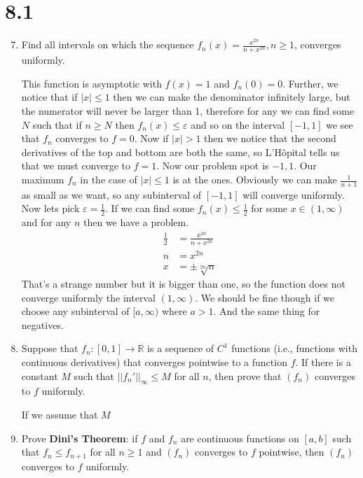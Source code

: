 \documentclass[letterpaper]{article}
\begin{document}
\renewcommand{\labelenumi}{\Alph{enumi}.}
\renewcommand{\labelenumii}{(\alph{enumii})}
\section*{8.1}
\begin{enumerate}
\setcounter{enumi}{6}
\item
  Find all intervals on which the sequence $f_n(x)=\frac{x^{2n}}{n+x^{2n}},n\ge 1$, converges uniformly.

  This function is asymptotic with $f(x)=1$ and $f_n(0)=0$. 
  Further, we notice that if $|x|\le 1$ then we can make the denominator infinitely large, but the numerator will never be larger than 1, therefore for any \varepsilon we can find some $N$ such that if $n\ge N$ then $f_n(x)\le \varepsilon$ and so on the interval $[-1,1]$ we see that $f_n$ converges to $f=0$. Now if $|x|>1$ then we notice that the second derivatives of the top and bottom are both the same, so L'Hôpital tells us that we must converge to $f=1$. Now our problem spot is $-1,1$. Our maximum $f_n$ in the case of $|x|\le 1$ is at the ones. Obviously we can make $\frac{1}{n+1}$ as small as we want, so any subinterval of $[-1,1]$ will converge uniformly. Now lets pick $\varepsilon=\frac{1}{2}$. If we can find some $f_n(x)\le \frac{1}{2}$ for some $x\in (1,\infty)$ and for any $n$ then we have a problem.
  \begin{align*}
    \frac{1}{2}&=\frac{x^{2n}}{n+x^{2n}}\\
    n&=x^{2n}\\
    x&=\pm\sqrt[2n]{n}
  \end{align*}
  That's a strange number but it is bigger than one, so the function does not converge uniformly the interval $(1,\infty)$. We should be fine though if we choose any subinterval of $[a,\infty)$ where $a>1$. And the same thing for negatives.
  \item
  Suppose that $f_n:[0,1]\to \mathbb{R}$ is a sequence of $C^1$ functions (i.e., functions with continuous derivatives) that converges pointwise to a function $f$. If there is a constant $M$ such that $||f_n'||_\infty\le M$ for all $n$, then prove that $(f_n)$ converges to $f$ uniformly.

  If we assume that $M$

\item
  Prove {\bfseries Dini's Theorem}: if $f$ and $f_n$ are continuous functions on $[a,b]$ such that $f_n\le f_{n+1}$ for all $n\ge 1$ and $(f_n)$ converges to $f$ pointwise, then $(f_n)$ converges to $f$ uniformly.


\end{enumerate}
\end{document}
